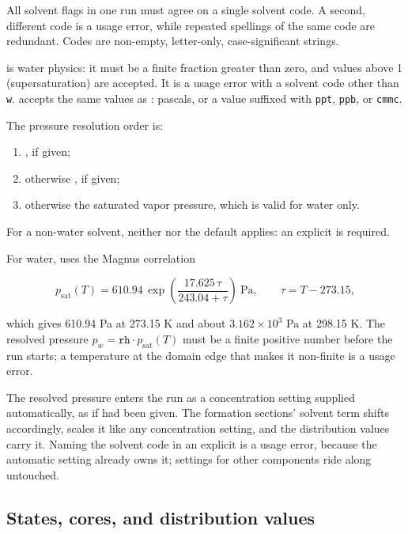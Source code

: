 All solvent flags in one run must agree on a single solvent code. A second,
different code is a usage error, while repeated spellings of the same code are
redundant. Codes are non-empty, letter-only, case-significant strings.

 is water physics: it must be a finite fraction greater than zero,
and values above 1 (supersaturation) are accepted. It is a usage error with a
solvent code other than \texttt{w}.  accepts the same values
as : pascals, or a value suffixed with \texttt{ppt}, \texttt{ppb},
or \texttt{cmmc}.

The pressure resolution order is:

\begin{enumerate}
  \item {}, if given;
  \item otherwise , if given;
  \item otherwise the saturated vapor pressure, which is valid for water only.
\end{enumerate}

For a non-water solvent, neither  nor the default applies: an
explicit  is required.

For water,  uses the Magnus correlation

\begin{equation}
p_{\mathrm{sat}}(T) = 610.94\,
  \exp\!\left(\frac{17.625\,\tau}{243.04+\tau}\right)\ \mathrm{Pa},
\qquad \tau = T - 273.15,
\end{equation}

which gives 610.94 Pa at 273.15 K and about $3.162\times10^3$ Pa at 298.15 K.
The resolved pressure $p_w = \texttt{rh}\cdot p_{\mathrm{sat}}(T)$ must be a
finite positive number before the run starts; a temperature at the domain edge
that makes it non-finite is a usage error.

The resolved pressure enters the run as a concentration setting supplied
automatically, as if  had been given. The formation
sections' solvent term shifts accordingly,  scales it like any
concentration setting, and the distribution values carry it. Naming the
solvent code in an explicit  is a usage error, because the
automatic setting already owns it; settings for other components ride along
untouched.

\subsection{States, cores, and distribution values}\label{sec:solvation-states}

